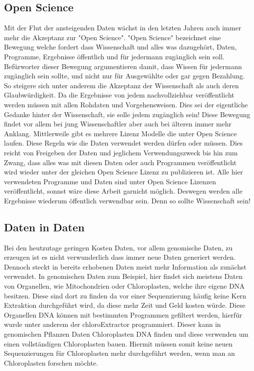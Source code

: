 \documentclass{scrartcl}
\begin{document}
\subsection{Open Science}
\label{sec-2-3}
Mit der Flut der ansteigenden Daten wächst in den letzten Jahren auch immer mehr die Akzeptanz zur "Open Science".
"Open Science" bezeichnet eine Bewegung welche fordert dass Wissenschaft und alles was dazugehört, Daten, Programme, Ergebnisse öffentlich und für jedermann 
zugänglich sein soll. Befürworter dieser Bewegung argumentieren damit, dass Wissen für jedermann zugänglich sein sollte, und nicht nur für Ausgewählte oder gar
gegen Bezahlung. So steigere sich unter anderem die Akzeptanz der Wissenschaft als auch deren Glaubwürdigkeit. Da die Ergebnisse von jedem nachvollziehbar 
veröffentlicht werden müssen mit allen Rohdaten und Vorgehensweisen. Dies sei der eigentliche Gedanke hinter der Wissenschaft, sie solle jedem zugänglich sein!
Diese Bewegung findet vor allem bei jung Wissenschaftler aber auch bei älteren immer mehr Anklang. Mittlerweile gibt es mehrere Lizenz Modelle die unter
Open Science laufen. Diese Regeln wie die Daten verwendet werden dürfen oder müssen. Dies reicht von Freigeben der Daten und jeglichem Verwendungszweck bis hin
zum Zwang, dass alles was mit diesen Daten oder auch Programmen veröffentlicht wird wieder unter der gleichen Open Science Lizenz zu publizieren ist.
Alle hier verwendeten Programme und Daten sind unter Open Science Lizenzen veröffentlicht, sonnst wäre diese Arbeit garnicht möglich. 
Deswegen werden alle Ergebnisse wiederum öffentlich verwendbar sein. Denn so sollte Wissenschaft sein!  

\subsection{Daten in Daten}
\label{sec-2-4}
Bei den heutzutage geringen Kosten Daten, vor allem genomische Daten, zu erzeugen ist es nicht verwunderlich dass immer neue Daten generiert werden.
Dennoch steckt in bereits erhobenen Daten meist mehr Information als zunächst verwendet. In genomischen Daten zum Beispiel, hier findet sich meistens Daten 
von Organellen, wie Mitochondrien oder Chloroplasten, welche ihre eigene DNA besitzen. Diese sind dort zu finden da vor einer Sequenzierung häufig keine 
Kern Extraktion durchgeführt wird, da diese mehr Zeit und Geld kosten würde. Diese Organellen DNA können mit bestimmten Programmen gefiltert werden, hierfür 
wurde unter anderem der chloroExtractor programmiert. Dieser kann in genomischen Pflanzen Daten Chloroplasten DNA finden und diese verwenden um einen vollständigen
Chloroplasten bauen. Hiermit müssen somit keine neuen Sequenzierungen für Chloroplasten mehr durchgeführt werden, wenn man an Chloroplasten forschen möchte.
\end{document}
